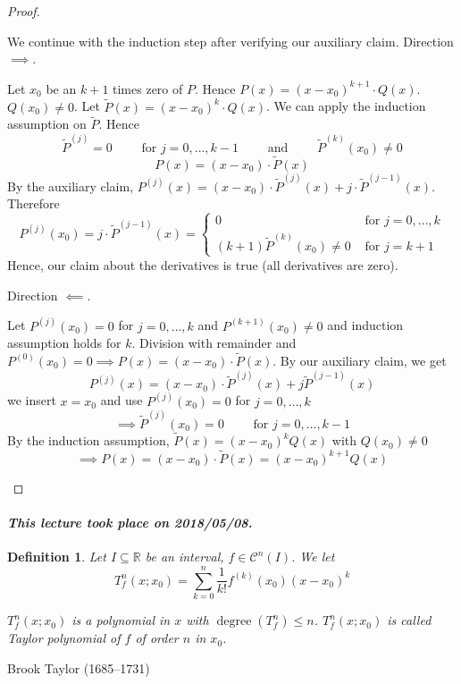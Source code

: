 \documentclass{article}
\newtheorem{definition}{Definition}  \numberwithin{definition}{section}
\newcommand{\dateref}[1]{\paragraph{\textit{This lecture took place on #1.}}}
\begin{document}
\begin{proof}
\begin{description}
      We continue with the induction step after verifying our auxiliary claim. Direction $\implies$.

      Let $x_0$ be an $k+1$ times zero of $P$. Hence $P(x) = (x - x_0)^{k+1} \cdot Q(x)$. $Q(x_0) \neq 0$.
      Let $\tilde P(x) = (x - x_0)^k \cdot Q(x)$. 
      We can apply the induction assumption on $\tilde P$. Hence
      \[ \tilde P^{(j)} = 0 \qquad \text{ for } j = 0, \ldots, k-1 \qquad \text{ and } \qquad \tilde P^{(k)}(x_0) \neq 0 \]
      \[ P(x) = (x - x_0) \cdot \tilde P(x) \]
      By the auxiliary claim, $P^{(j)}(x) = (x - x_0) \cdot \tilde P^{(j)}(x) + j \cdot \tilde P^{(j-1)}(x)$.
      Therefore
      \[
        P^{(j)}(x_0) = j \cdot \tilde P^{(j-1)}(x) = \begin{cases}
          0 & \text{ for } j = 0, \dots, k \\
          (k+1)\tilde P^{(k)}(x_0) \neq 0 & \text{ for } j = k+1
        \end{cases}
      \]
      Hence, our claim about the derivatives is true (all derivatives are zero).

      Direction $\impliedby$.

      Let $P^{(j)}(x_0) = 0$ for $j = 0, \dots, k$ and $P^{(k+1)}(x_0) \neq 0$ and induction assumption holds for $k$.
      Division with remainder and $P^{(0)}(x_0) = 0 \implies P(x) = (x - x_0) \cdot \tilde P(x)$.
      By our auxiliary claim, we get
      \[ P^{(j)}(x) = (x - x_0) \cdot \tilde P^{(j)}(x) + j \tilde P^{(j-1)}(x) \]
      we insert $x = x_0$ and use $P^{(j)}(x_0) = 0$ for $j = 0, \dots, k$
      \[ \implies \tilde P^{(j)}(x_0) = 0 \qquad \text{ for } j = 0, \dots, k-1 \]
      By the induction assumption, $\tilde P(x) = (x - x_0)^k Q(x)$ with $Q(x_0) \neq 0$
      \[ \implies P(x) = (x - x_0) \cdot \tilde P(x) = (x - x_0)^{k+1} Q(x) \]
  \end{description}
\end{proof}

\dateref{2018/05/08}

\begin{definition} %
  \label{def3}
  Let $I \subseteq \mathbb R$ be an interval, $f \in \mathcal C^n(I)$.
  We let
  \[ T_f^n(x; x_0) = \sum_{k=0}^n \frac{1}{k!} f^{(k)}(x_0) (x - x_0)^k \]

  $T_f^n(x; x_0)$ is a polynomial in $x$ with $\operatorname{degree}(T_f^n) \leq n$.
  $T_f^n(x; x_0)$ is called \emph{Taylor polynomial of $f$ of order $n$ in $x_0$}.
\end{definition}
Brook Taylor (1685--1731)
\end{document}
